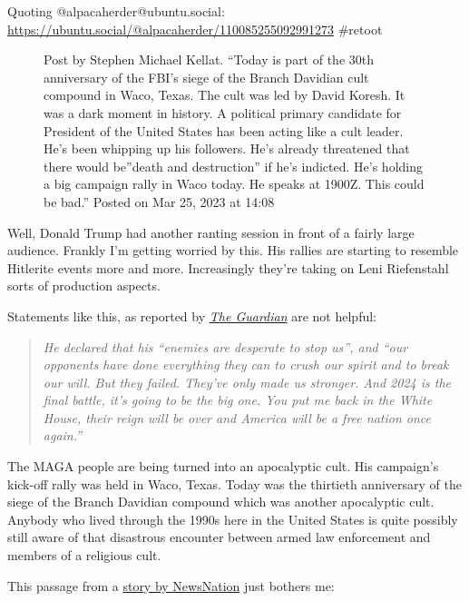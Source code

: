 Quoting @alpacaherder@ubuntu.social:
\url{https://ubuntu.social/@alpacaherder/110085255092991273} \#retoot

\begin{figure}
\centering
{}
\caption{Post by Stephen Michael Kellat. ``Today is part of the 30th
anniversary of the FBI's siege of the Branch Davidian cult compound in
Waco, Texas. The cult was led by David Koresh. It was a dark moment in
history. A political primary candidate for President of the United
States has been acting like a cult leader. He's been whipping up his
followers. He's already threatened that there would be''death and
destruction'' if he's indicted. He's holding a big campaign rally in
Waco today. He speaks at 1900Z. This could be bad.'' Posted on Mar 25,
2023 at 14:08}
\end{figure}

Well, Donald Trump had another ranting session in front of a fairly
large audience. Frankly I'm getting worried by this. His rallies are
starting to resemble Hitlerite events more and more. Increasingly
they're taking on Leni Riefenstahl sorts of production aspects.

Statements like this, as reported by
\href{https://www.theguardian.com/us-news/2023/mar/26/trump-waco-texas-2024-election-final-battle-january-6}{\emph{The
Guardian}} are not helpful:

\begin{quote}
\emph{He declared that his ``enemies are desperate to stop us'', and
``our opponents have done everything they can to crush our spirit and to
break our will. But they failed. They've only made us stronger. And 2024
is the final battle, it's going to be the big one. You put me back in
the White House, their reign will be over and America will be a free
nation once again.''}
\end{quote}

The MAGA people are being turned into an apocalyptic cult. His
campaign's kick-off rally was held in Waco, Texas. Today was the
thirtieth anniversary of the siege of the Branch Davidian compound which
was another apocalyptic cult. Anybody who lived through the 1990s here
in the United States is quite possibly still aware of that disastrous
encounter between armed law enforcement and members of a religious cult.

This passage from a
\href{https://www.newsnationnow.com/politics/trump-waco-texas-campaign-rally/}{story
by NewsNation} just bothers me:

